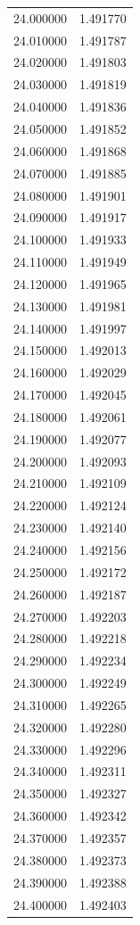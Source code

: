 \begin{tabular}{rr}
24.000000 & 1.491770 \\
24.010000 & 1.491787 \\
24.020000 & 1.491803 \\
24.030000 & 1.491819 \\
24.040000 & 1.491836 \\
24.050000 & 1.491852 \\
24.060000 & 1.491868 \\
24.070000 & 1.491885 \\
24.080000 & 1.491901 \\
24.090000 & 1.491917 \\
24.100000 & 1.491933 \\
24.110000 & 1.491949 \\
24.120000 & 1.491965 \\
24.130000 & 1.491981 \\
24.140000 & 1.491997 \\
24.150000 & 1.492013 \\
24.160000 & 1.492029 \\
24.170000 & 1.492045 \\
24.180000 & 1.492061 \\
24.190000 & 1.492077 \\
24.200000 & 1.492093 \\
24.210000 & 1.492109 \\
24.220000 & 1.492124 \\
24.230000 & 1.492140 \\
24.240000 & 1.492156 \\
24.250000 & 1.492172 \\
24.260000 & 1.492187 \\
24.270000 & 1.492203 \\
24.280000 & 1.492218 \\
24.290000 & 1.492234 \\
24.300000 & 1.492249 \\
24.310000 & 1.492265 \\
24.320000 & 1.492280 \\
24.330000 & 1.492296 \\
24.340000 & 1.492311 \\
24.350000 & 1.492327 \\
24.360000 & 1.492342 \\
24.370000 & 1.492357 \\
24.380000 & 1.492373 \\
24.390000 & 1.492388 \\
24.400000 & 1.492403 \\

\end{tabular}
